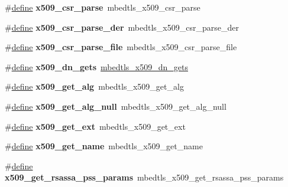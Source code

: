 \begin{DoxyCompactItemize}
\item 
\mbox{\label{compat-1_83_8h_a53f1c7467984c7061ebf469e47b1279e}} 
\#\hyperlink{structdefine}{define} {\bfseries x509\+\_\+csr\+\_\+parse}~mbedtls\+\_\+x509\+\_\+csr\+\_\+parse
\item 
\mbox{\label{compat-1_83_8h_ad3da14d109ae02360877cf83611f5733}} 
\#\hyperlink{structdefine}{define} {\bfseries x509\+\_\+csr\+\_\+parse\+\_\+der}~mbedtls\+\_\+x509\+\_\+csr\+\_\+parse\+\_\+der
\item 
\mbox{\label{compat-1_83_8h_aa565e064da1d25908170bce64e856391}} 
\#\hyperlink{structdefine}{define} {\bfseries x509\+\_\+csr\+\_\+parse\+\_\+file}~mbedtls\+\_\+x509\+\_\+csr\+\_\+parse\+\_\+file
\item 
\mbox{\label{compat-1_83_8h_a7e76871d8c79fadbfc5ad0a10498f091}} 
\#\hyperlink{structdefine}{define} {\bfseries x509\+\_\+dn\+\_\+gets}~\hyperlink{x509_8h_a576f34a7432238db229137bdfc3cfde0}{mbedtls\+\_\+x509\+\_\+dn\+\_\+gets}
\item 
\mbox{\label{compat-1_83_8h_ac7eafb3788a5f4533931a305b37c2913}} 
\#\hyperlink{structdefine}{define} {\bfseries x509\+\_\+get\+\_\+alg}~mbedtls\+\_\+x509\+\_\+get\+\_\+alg
\item 
\mbox{\label{compat-1_83_8h_a988212811f7aaae5e15f3b303201572f}} 
\#\hyperlink{structdefine}{define} {\bfseries x509\+\_\+get\+\_\+alg\+\_\+null}~mbedtls\+\_\+x509\+\_\+get\+\_\+alg\+\_\+null
\item 
\mbox{\label{compat-1_83_8h_a8160289581a9ab2bd8b6af3966676ff2}} 
\#\hyperlink{structdefine}{define} {\bfseries x509\+\_\+get\+\_\+ext}~mbedtls\+\_\+x509\+\_\+get\+\_\+ext
\item 
\mbox{\label{compat-1_83_8h_a996ce2a682b0f7e6e76e953bee47470c}} 
\#\hyperlink{structdefine}{define} {\bfseries x509\+\_\+get\+\_\+name}~mbedtls\+\_\+x509\+\_\+get\+\_\+name
\item 
\mbox{\label{compat-1_83_8h_acfa88e7e8015034d79e16b9b940e4634}} 
\#\hyperlink{structdefine}{define} {\bfseries x509\+\_\+get\+\_\+rsassa\+\_\+pss\+\_\+params}~mbedtls\+\_\+x509\+\_\+get\+\_\+rsassa\+\_\+pss\+\_\+params

\end{DoxyCompactItemize}

